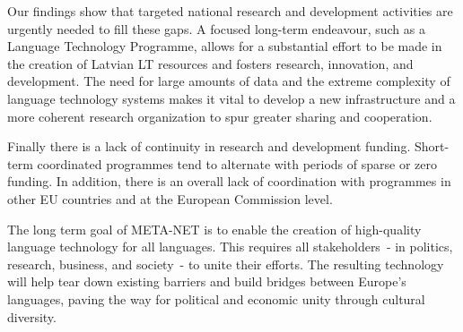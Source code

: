 \begin{multicols}{2}
Our findings show that targeted national research and development activities are urgently needed to fill these gaps.
A focused long-term endeavour, such as a Language Technology Programme, allows for a substantial effort to be made in the creation of Latvian LT resources and fosters research, innovation, and development.
The need for large amounts of data and the extreme complexity of language technology systems makes it vital to develop a new infrastructure and a more coherent research organization to spur greater sharing and cooperation.

Finally there is a lack of continuity in research and development funding.
Short-term coordinated programmes tend to alternate with periods of sparse or zero funding.
In addition, there is an overall lack of coordination with programmes in other EU countries and at the European Commission level.

The long term goal of META-NET is to enable the creation of high-quality language technology for all languages.
This requires all stakeholders~- in politics, research, business, and society~- to unite their efforts.
The resulting technology will help tear down existing barriers and build bridges between Europe's languages, paving the way for political and economic unity through cultural diversity.

\end{multicols}

\clearpage


